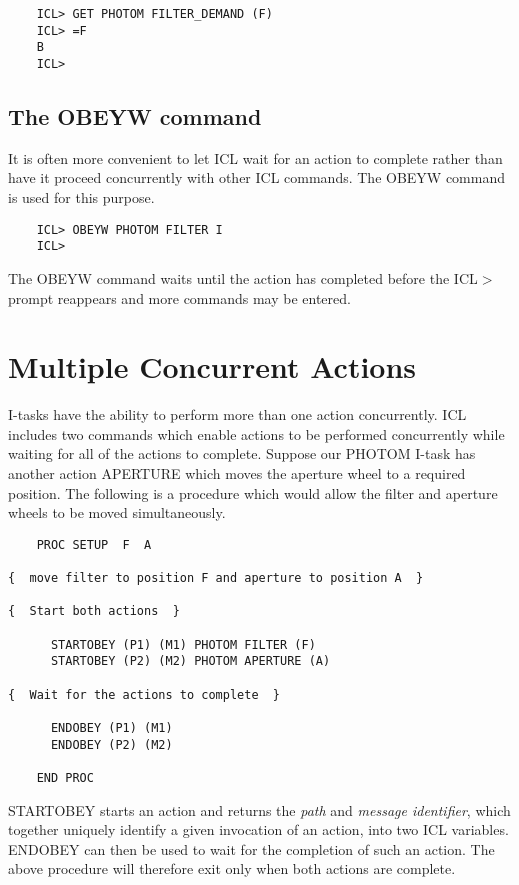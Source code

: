 \documentclass[twoside,11pt]{report}
\newcommand{\xlabel}[1]{}
\begin{document}
\begin{verbatim}
    ICL> GET PHOTOM FILTER_DEMAND (F)
    ICL> =F
    B
    ICL>
\end{verbatim}

\subsection{\xlabel{the_obeyw_command}The OBEYW command}

It is often more convenient to let ICL wait for an action to complete rather than
have it proceed concurrently with other ICL commands. The OBEYW command
is used for this purpose.

\begin{verbatim}
    ICL> OBEYW PHOTOM FILTER I
    ICL>
\end{verbatim}

The OBEYW command waits until the action has completed before the ICL$>$
prompt reappears and more commands may be entered.

\section{\xlabel{multiple_concurrent_actions}Multiple Concurrent Actions}

I-tasks have the ability to perform more than one action concurrently.
ICL includes two commands which enable actions to be performed concurrently
while waiting for all of the actions to complete. Suppose our PHOTOM
I-task has another action APERTURE which moves the aperture wheel to
a required position. The following is a procedure which would allow the
filter and aperture wheels to be moved simultaneously.

\begin{verbatim}
    PROC SETUP  F  A

{  move filter to position F and aperture to position A  }

{  Start both actions  }

      STARTOBEY (P1) (M1) PHOTOM FILTER (F)
      STARTOBEY (P2) (M2) PHOTOM APERTURE (A)

{  Wait for the actions to complete  }

      ENDOBEY (P1) (M1)
      ENDOBEY (P2) (M2)

    END PROC
\end{verbatim}

STARTOBEY starts an action and returns the {\em path} and {\em message
identifier}, which together uniquely identify a given invocation of an action,
into two ICL variables. ENDOBEY can then be used to wait for the completion
of such an action. The above procedure will therefore exit only when both
actions are complete.
\end{document}
